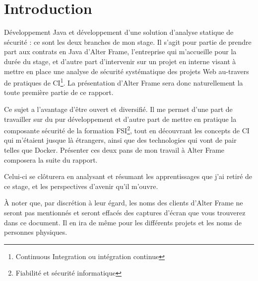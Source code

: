 \section{Introduction}
Développement Java et développement d'une solution d'analyse statique de sécurité : ce sont les deux branches de mon stage. Il s'agit pour partie de prendre part aux contrats en Java d'Alter Frame, l'entreprise qui m'accueille pour la durée du stage, et d'autre part d'intervenir sur un projet en interne visant à mettre en place une analyse de sécurité systématique des projets Web au-travers de pratiques de CI\cite{ci_wiki}\footnote{Continuous Integration ou intégration continue}. La présentation d'Alter Frame sera donc naturellement la toute première partie de ce rapport.

Ce sujet a l'avantage d'être ouvert et diversifié. Il me permet d'une part de travailler sur du pur développement et d'autre part de mettre en pratique la composante sécurité de la formation FSI\cite{fsi}\footnote{Fiabilité et sécurité informatique}, tout en découvrant les concepts de CI qui m'étaient jusque là étrangers, ainsi que des technologies qui vont de pair telles que Docker. Présenter ces deux pans de mon travail à Alter Frame composera la suite du rapport.

Celui-ci se clôturera en analysant et résumant les apprentissages que j'ai retiré de ce stage, et les perspectives d'avenir qu'il m'ouvre.

À noter que, par discrétion à leur égard, les noms des clients d'Alter Frame ne seront pas mentionnés et seront effacés des captures d'écran que vous trouverez dans ce document. Il en ira de même pour les différents projets et les noms de personnes physiques.